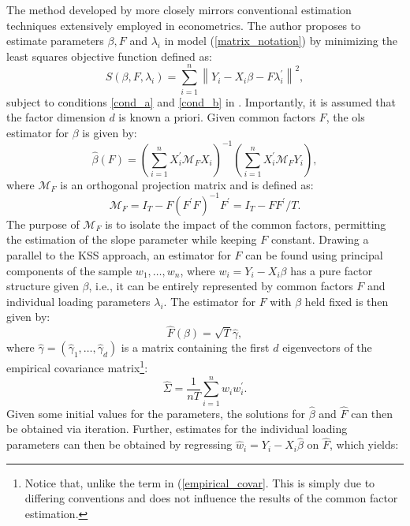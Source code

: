 The method developed by \citet{bai2009panel} more closely mirrors conventional estimation techniques extensively employed in econometrics. The author proposes to estimate parameters $\beta, F$ and $\lambda_i$ in model (\ref{matrix_notation})  by minimizing the least squares objective function defined as:
\begin{equation}\label{obj.fn.bai}
    S\left(\beta, F, \lambda_i\right)=\sum_{i=1}^n\left\|Y_i-X_i \beta-F \lambda_i^{\prime}\right\|^2 ,
\end{equation}
subject to conditions \ref{cond_a} and \ref{cond_b} in . Importantly, it is assumed that the factor dimension $d$ is known a priori. Given common factors $F$, the \ac{ols} estimator for $\beta$ is given by:
\begin{equation}
    \hat{\beta}(F)=\left(\sum_{i=1}^n X_i^{\prime} \mathcal{M}_F X_i\right)^{-1}\left(\sum_{i=1}^n X_i^{\prime} \mathcal{M}_F Y_i\right) ,
\end{equation}
where $\mathcal{M}_F$ is an orthogonal projection matrix and is defined as:
\begin{equation}
    \mathcal{M}_F  =  I_T - F(F^\prime F)^{-1}F^\prime = I_T - FF^\prime/T .
\end{equation}
The purpose of \(\mathcal{M}_F\) is to isolate the impact of the common factors, permitting the estimation of the slope parameter while keeping \(F\) constant. Drawing a parallel to the \ac{KSS} approach, an estimator for $F$ can be found using principal components of the sample $w_1, \ldots, w_n$, where $w_i = Y_i - X_i \beta$ has a pure factor structure given $\beta$, i.e., it can be entirely represented by common factors $F$ and individual loading parameters $\lambda_i$. The estimator for $F$ with $\beta$ held fixed is then given by:
 \begin{equation}
    \hat{F}(\beta) = \sqrt{T}\hat{\gamma},
\end{equation}
where $\hat{\gamma} = (\hat{\gamma}_1, \ldots, \hat{\gamma}_d)$ is a matrix containing the  first $d$ eigenvectors of the empirical covariance matrix\footnote{Notice that, unlike the term in  (\ref{empirical_covar}. This is simply due to differing conventions and does not influence the results of the common factor estimation.}:
  \begin{equation}\label{eq:covar2}
    \hat{\Sigma} = \frac{1}{nT} \sum_{i=1}^nw_i w_i^\prime .
\end{equation}
Given some initial values for the parameters, the solutions for $\hat{\beta}$ and $\hat{F}$ can then be obtained via iteration. Further, estimates for the individual loading parameters can then be obtained by regressing $\hat{w}_i = Y_i - X_i\hat{\beta}$ on $\hat{F}$, which yields:
